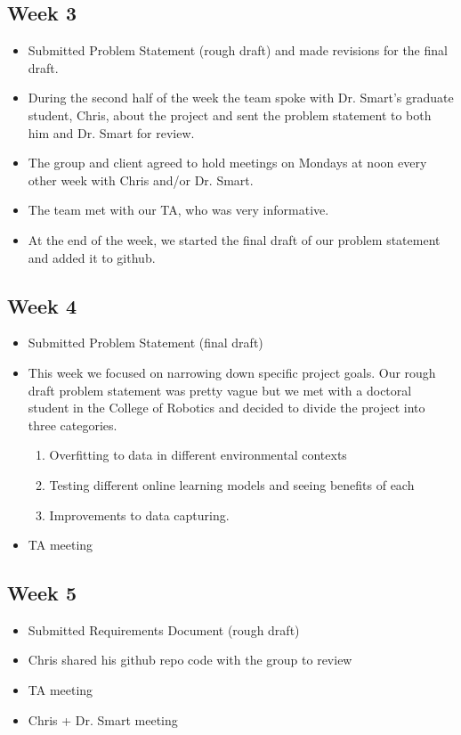 \documentclass[draftclsnofoot, onecolumn, 10pt, compsoc]{IEEEtran}
\begin{document}
\subsection{Week 3}
  \begin{itemize}
      \item Submitted Problem Statement (rough draft) and made revisions for the final draft.
      \item During the second half of the week the team spoke with Dr. Smart's graduate student, Chris, about the project and sent the problem statement to both him and Dr. Smart for review. 
      \item The group and client agreed to hold meetings on Mondays at noon every other week with Chris and/or Dr. Smart.
      \item The team met with our TA, who was very informative. 
      \item At the end of the week, we started the final draft of our problem statement and added it to github. 
  \end{itemize}
  
\subsection{Week 4}
  \begin{itemize}
      \item Submitted Problem Statement (final draft)
      \item This week we focused on narrowing down specific project goals. Our rough draft problem statement was pretty vague but we met with a doctoral student in the College of Robotics and decided to divide the project into three categories. 
      \begin{enumerate}
       	\item Overfitting to data in different environmental contexts 
        \item Testing different online learning models and seeing benefits of each
        \item Improvements to data capturing. 
      \end{enumerate}
      \item TA meeting
  \end{itemize}
  
\subsection{Week 5}
  \begin{itemize}
      \item Submitted Requirements Document (rough draft)
      \item Chris shared his github repo code with the group to review
      \item TA meeting
      \item Chris + Dr. Smart meeting
  \end{itemize}
  
\end{document}
